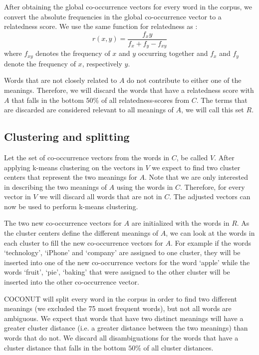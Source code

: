 \documentclass[11pt]{article}
\begin{document}
After obtaining the global co-occurrence vectors for every word in the corpus, we convert the absolute frequencies in the global co-occurrence vector to a relatedness score. We use the same function for relatedness as \cite{Guthrie:92}:
$$r(x, y) = \frac{f_xy}{f_x+f_y - f_{xy}}$$
where $f_{xy}$ denotes the frequency of $x$ and $y$ occurring together and $f_x$ and $f_y$ denote the frequency of $x$, respectively $y$. 

Words that are not closely related to $A$ do not contribute to either one of the meanings. Therefore, we will discard the words that have a relatedness score with $A$ that falls in the bottom $50\%$ of all relatedness-scores from $C$. The terms that are discarded are considered relevant to all meanings of $A$, we will call this set $R$.

\subsection{Clustering and splitting}
Let the set of co-occurrence vectors from the words in $C$, be called $V$. After applying k-means clustering on the vectors in $V$ we expect to find two cluster centers that represent the two meanings for $A$. Note that we are only interested in describing the two meanings of $A$ using the words in $C$. Therefore, for every vector in $V$ we will discard all words that are not in $C$. The adjusted vectors can now be used to perform k-means clustering. 

The two new co-occurrence vectors for $A$ are initialized with the words in $R$. As the cluster centers define the different meanings of $A$, we can look at the words in each cluster to fill the new co-occurrence vectors for $A$. For example if the words `technology', `iPhone' and `company' are assigned to one cluster, they will be inserted into one of the new co-occurrence vectors for the word `apple' while the words `fruit', `pie', `baking' that were assigned to the other cluster will be inserted into the other co-occurrence vector. 

COCONUT will split every word in the corpus in order to find two different meanings (we excluded the 75 most frequent words), but not all words are ambiguous. We expect that words that have two distinct meanings will have a greater cluster distance (i.e. a greater distance between the two meanings) than words that do not. We discard all disambiguations for the words that have a cluster distance that falls in the bottom $50\%$ of all cluster distances.
\end{document}

